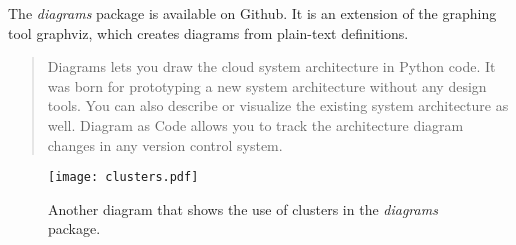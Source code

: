 \documentclass{article}
\begin{document}
The \textit{diagrams} package is available on Github.
It is an extension of the graphing tool graphviz, which creates diagrams from plain-text definitions.

\begin{quote}
    Diagrams lets you draw the cloud system architecture in Python code.
    It was born for prototyping a new system architecture without any design tools. You can also describe or visualize the existing system architecture as well.
    Diagram as Code allows you to track the architecture diagram changes in any version control system.

    \textcite{DiagramsDiagramCode}
\end{quote}

\begin{figure}[h]
    \texttt{[image: clusters.pdf]}
    \centering
    \caption{Another diagram that shows the use of clusters in the \textit{diagrams} package. \textcite{ClustersDiagrams}}
    \label{fig:clusters}
\end{figure}

\newpage
\printbibliography
\end{document}
